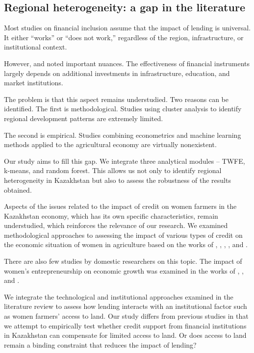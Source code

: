 ﻿\documentclass[pdflatex,sn-mathphys-ay]{sn-jnl}
\begin{document}
\subsection{Regional heterogeneity: a gap in the literature}

Most studies on financial inclusion assume that the impact of lending is
universal. It either ``works'' or ``does not work,'' regardless of the
region, infrastructure, or institutional context.

However, \citet{ref21} and \citet{ref17}
noted important nuances. The effectiveness of financial
instruments largely depends on additional investments in infrastructure,
education, and market institutions.

The problem is that this aspect remains understudied. Two reasons can be
identified. The first is methodological. Studies using cluster analysis
to identify regional development patterns are extremely limited.

The second is empirical. Studies combining econometrics and machine
learning methods applied to the agricultural economy are virtually
nonexistent.

Our study aims to fill this gap. We integrate three analytical modules
-- TWFE, k-means, and random forest. This allows us not only to identify
regional heterogeneity in Kazakhstan but also to assess the robustness
of the results obtained.

Aspects of the issues related to the impact of credit on women farmers
in the Kazakhstan economy, which has its own specific characteristics,
remain understudied, which reinforces the relevance of our research. We
examined methodological approaches to assessing the impact of various
types of credit on the economic situation of women in agriculture based
on the works of \citet{ref10}, \citet{ref03}, \citet{ref30}, \citet{ref41}, and \citet{ref59}.

There are also few studies by domestic researchers on this topic. The
impact of women's entrepreneurship on economic growth was examined in
the works of \citet{ref07}, \citet{ref15}, and \citet{ref51}.

We integrate the technological and institutional approaches examined in
the literature review to assess how lending interacts with an
institutional factor such as women farmers' access to land. Our study
differs from previous studies in that we attempt to empirically test
whether credit support from financial institutions in Kazakhstan can
compensate for limited access to land. Or does access to land remain a
binding constraint that reduces the impact of lending?
\end{document}
